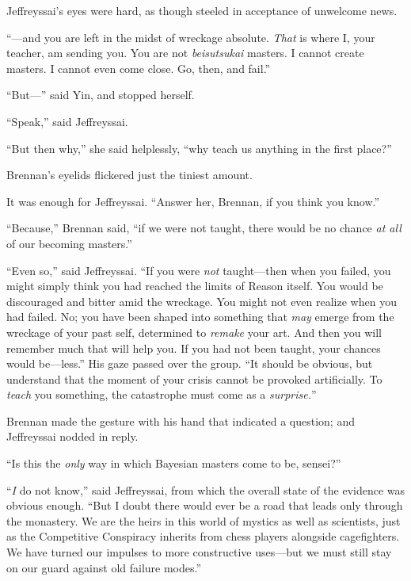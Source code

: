 {
 Jeffreyssai's eyes were hard, as though steeled in
acceptance of unwelcome news.}

{
 ``---and you are left in the midst of wreckage
absolute. \textit{That} is where I, your teacher, am sending you. You
are not \textit{beisutsukai} masters. I cannot create masters. I cannot
even come close. Go, then, and fail.''}

{
 ``But---'' said Yin, and
stopped herself.}

{
 ``Speak,'' said Jeffreyssai.}

{
 ``But then why,'' she said
helplessly, ``why teach us anything in the first
place?''}

{
 Brennan's eyelids flickered just the tiniest
amount.}

{
 It was enough for Jeffreyssai. ``Answer her,
Brennan, if you think you know.''}

{
 ``Because,'' Brennan said,
``if we were not taught, there would be no chance
\textit{at all} of our becoming masters.''}

{
 ``Even so,'' said Jeffreyssai.
``If you were \textit{not} taught---then when you
failed, you might simply think you had reached the limits of Reason
itself. You would be discouraged and bitter amid the wreckage. You
might not even realize when you had failed. No; you have been shaped
into something that \textit{may} emerge from the wreckage of your past
self, determined to \textit{remake} your art. And then you will
remember much that will help you. If you had not been taught, your
chances would be---less.'' His gaze passed over the
group. ``It should be obvious, but understand that the
moment of your crisis cannot be provoked artificially. To
\textit{teach} you something, the catastrophe must come as a
\textit{surprise.}''}

{
 Brennan made the gesture with his hand that indicated a question;
and Jeffreyssai nodded in reply.}

{
 ``Is this the \textit{only} way in which Bayesian
masters come to be, sensei?''}

{
 ``\textit{I} do not know,''
said Jeffreyssai, from which the overall state of the evidence was
obvious enough. ``But I doubt there would ever be a
road that leads only through the monastery. We are the heirs in this
world of mystics as well as scientists, just as the Competitive
Conspiracy inherits from chess players alongside cagefighters. We have
turned our impulses to more constructive uses---but we must still stay
on our guard against old failure modes.''}

